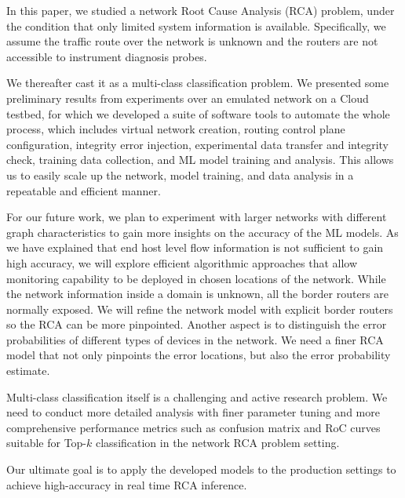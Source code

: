 In this paper,  we studied a network Root Cause Analysis (RCA) problem, under the condition that only limited system information is available. Specifically, we assume the traffic route over the network is unknown and the routers are not accessible to instrument diagnosis probes.

We thereafter cast it as a multi-class classification problem. We presented some preliminary results from experiments over an emulated network on a Cloud testbed, for which we developed a suite of software tools to automate the whole process, which includes virtual network creation, routing control plane configuration, integrity error injection, experimental data transfer and integrity check, training data collection, and ML model training and analysis. This allows us to easily scale up the network, model training, and data analysis in a repeatable and efficient manner. 

For our future work, we plan to experiment with larger networks with different graph characteristics to gain more insights on the accuracy of the ML models. As we have explained that end host level flow information is not sufficient to gain high accuracy, we will explore efficient algorithmic approaches that allow monitoring capability to be deployed in chosen locations of the network. While the network information inside a domain is unknown, all the border routers are normally exposed. We will refine the network model with explicit border routers so the RCA can be more pinpointed. Another aspect is to distinguish the error probabilities of different types of devices in the network. We need a finer RCA model that not only pinpoints the error locations, but also the error probability estimate. 

Multi-class classification itself is a challenging and active research problem. We need to conduct more detailed analysis with finer parameter tuning and more comprehensive performance metrics such as confusion matrix and RoC curves suitable for Top-$k$ classification in the network RCA problem setting.

Our ultimate goal is to apply the developed models to the production settings to achieve high-accuracy in real time RCA inference.

